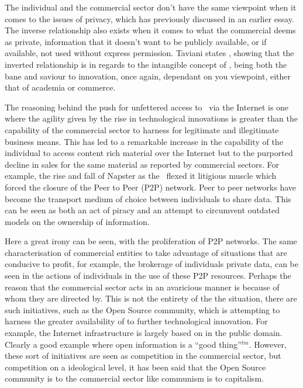 The individual and the commercial sector don't have the same viewpoint when it comes to the issues of privacy, which has previously discussed in an earlier essay\cite{pete}. The inverse relationship also exists when it comes to what the commercial deems as private, information that it doesn't want to be publicly available, or if available, not used without express permission. Taviani states , showing that the inverted relationship is in regards to the intangible concept of \IP, being both the bane and saviour to innovation, once again, dependant on you viewpoint, either that of academia or commerce.

The reasoning behind the push for unfettered access to \IP\ via the Internet is one where the agility given by the rise in technological innovations is greater than the capability of the commercial sector to harness for legitimate and illegitimate business means. This has led to a remarkable increase in the capability of the individual to access content rich material over the Internet but to the purported decline in sales for the same material as reported by commercial sectors. For example, the rise and fall of Napster as the \RIAA\ flexed it litigious muscle which forced the closure of the Peer to Peer (P2P) network\cite{nawci}. Peer to peer networks have become the transport medium of choice between individuals to share data. This can be seen as both an act of piracy and an attempt to circumvent outdated models on the ownership of information.

Here a great irony can be seen, with the proliferation of P2P networks. The same characterisation of commercial entities to take advantage of situations that are conducive to profit, for example, the brokerage of individuals private data, can be seen in the actions of individuals in the use of these P2P resources. Perhaps the reason that the commercial sector acts in an avaricious manner is because of whom they are directed by. This is not the entirety of the the situation, there are such initiatives, such as the Open Source community, which is attempting to harness the greater availability of \IP to further technological innovation. For example, the Internet infrastructure is largely based on \IP in the public domain. Clearly a good example where open information is a ``good thing''$^{tm}$. However, these sort of initiatives are seen as competition in the commercial sector, but competition on a ideological level, it has been said that the Open Source community is to the commercial sector like communism is to capitalism.

